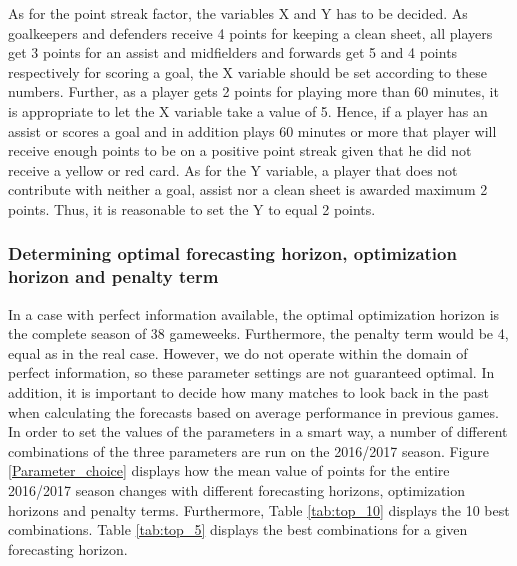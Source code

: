 As for the point streak factor, the variables X and Y has to be decided. As goalkeepers and defenders receive 4 points for keeping a clean sheet, all players get 3 points for an assist and midfielders and forwards get 5 and 4 points respectively for scoring a goal, the X variable should be set according to these numbers. Further, as a player gets 2 points for playing more than 60 minutes, it is appropriate to let the X variable take a value of 5. Hence, if a player has an assist or scores a goal and in addition plays 60 minutes or more that player will receive enough points to be on a positive point streak given that he did not receive a yellow or red card. As for the Y variable, a player that does not contribute with neither a goal, assist nor a clean sheet is awarded maximum 2 points. Thus, it is reasonable to set the Y to equal 2 points. 
\subsubsection{Determining optimal forecasting horizon, optimization horizon and penalty term}

In a case with perfect information available, the optimal optimization horizon is the complete season of 38 gameweeks. Furthermore, the penalty term would be 4, equal as in the real case. However, we do not operate within the domain of perfect information, so these parameter settings are not guaranteed optimal. In addition, it is important to decide how many matches to look back in the past when calculating the forecasts based on average performance in previous games.
\newpar 
In order to set the values of the parameters in a smart way, a number of different combinations of the three parameters are run on the 2016/2017 season. Figure \ref{Parameter_choice} displays how the mean value of points for the entire 2016/2017 season changes with different forecasting horizons, optimization horizons and penalty terms. Furthermore, Table \ref{tab:top_10} displays the 10 best combinations. Table \ref{tab:top_5} displays the best combinations for a given forecasting horizon. 

